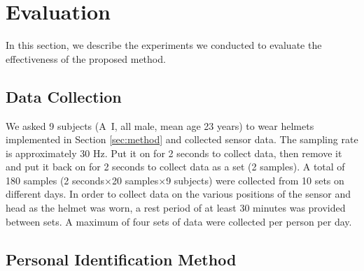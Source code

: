 \documentclass[sigchi,authordraft]{acmart}
\begin{document}

\section{Evaluation}
\label{sec:evaluation}
In this section, we describe the experiments we conducted to evaluate the effectiveness of the proposed method.


\subsection{Data Collection}
We asked 9 subjects (A~I, all male, mean age 23 years) to wear helmets implemented in Section \ref{sec:method} and collected sensor data. The sampling rate is approximately 30 Hz. Put it on for 2 seconds to collect data, then remove it and put it back on for 2 seconds to collect data as a set (2 samples). A total of 180 samples (2 seconds$\times$20 samples$\times$9 subjects) were collected from 10 sets on different days. In order to collect data on the various positions of the sensor and head as the helmet was worn, a rest period of at least 30 minutes was provided between sets. A maximum of four sets of data were collected per person per day.


\subsection{Personal Identification Method}
\end{document}
